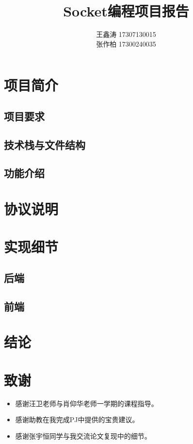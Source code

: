 \documentclass[12pt]{article} %
\title{\textbf{Socket编程项目报告}}
\author{王鑫涛 17307130015\\张作柏 17300240035}
\begin{document}
\begin{sloppypar}
\maketitle

\pagestyle{fancy}
\lhead{\textbf{{\thetitle}}}
\rhead{\textbf{\nouppercase{\firstleftmark}}}
\cfoot{\thepage}

\thispagestyle{empty}
\tableofcontents
\clearpage

\setcounter{page}{1}


\section{项目简介}

\subsection{项目要求}

\subsection{技术栈与文件结构}

\subsection{功能介绍}

\section{协议说明}

\section{实现细节}

\subsection{后端}

\subsection{前端}

\section{结论}





\newpage
 


\section*{致谢}


\begin{itemize}
\item 感谢汪卫老师与肖仰华老师一学期的课程指导。
\item 感谢助教在我完成PJ中提供的宝贵建议。
\item 感谢张宇恒同学与我交流论文复现中的细节。
\end{itemize}




\end{sloppypar}
\end{document}
